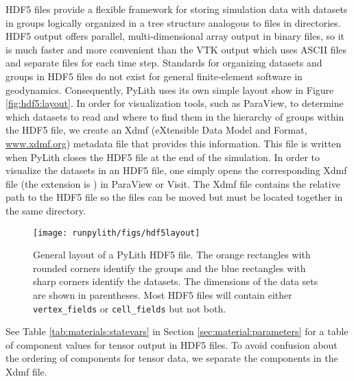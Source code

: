 HDF5 files provide a flexible framework for storing simulation data
with datasets in groups logically organized in a tree structure analogous
to files in directories. HDF5 output offers parallel, multi-dimensional
array output in binary files, so it is much faster and more convenient
than the VTK output which uses ASCII files and separate files for
each time step. Standards for organizing datasets and groups in HDF5
files do not exist for general finite-element software in geodynamics.
Consequently, PyLith uses its own simple layout show in Figure \vref{fig:hdf5:layout}.
In order for visualization tools, such as ParaView, to determine which
datasets to read and where to find them in the hierarchy of groups
within the HDF5 file, we create an Xdmf (eXtensible Data Model and
Format, \url{www.xdmf.org}) metadata file that provides this information.
This file is written when PyLith closes the HDF5 file at the end of
the simulation. In order to visualize the datasets in an HDF5 file,
one simply opens the corresponding Xdmf file (the extension is )
in ParaView or Visit. The Xdmf file contains the relative path to
the HDF5 file so the files can be moved but must be located together
in the same directory. 


\begin{figure}[htbp]
  \texttt{[image: runpylith/figs/hdf5layout]}
  \caption{General layout of a PyLith HDF5 file. The orange rectangles
    with rounded corners identify the groups and the blue rectangles
    with sharp corners identify the datasets. The dimensions of the
    data sets are shown in parentheses. Most HDF5 files will contain
    either \texttt{vertex\_fields} or \texttt{cell\_fields} but not
    both.}
 \label{fig:hdf5:layout}
\end{figure}

See Table \vref{tab:materials:statevars} in Section
\vref{sec:material:parameters} for a table of component values for
tensor output in HDF5 files. To avoid confusion about the ordering of
components for tensor data, we separate the components in the Xdmf
file.

